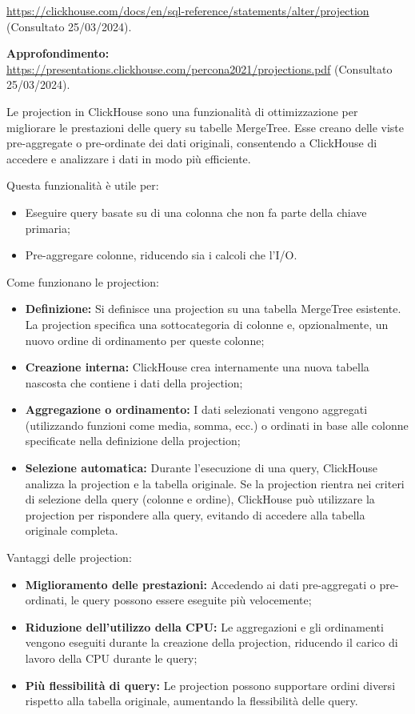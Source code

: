 \url{https://clickhouse.com/docs/en/sql-reference/statements/alter/projection} (Consultato 25/03/2024).

\textbf{Approfondimento:} \url{https://presentations.clickhouse.com/percona2021/projections.pdf} (Consultato 25/03/2024).

Le projection in ClickHouse sono una funzionalità di ottimizzazione per migliorare le prestazioni delle query su tabelle MergeTree. Esse creano delle viste pre-aggregate o pre-ordinate dei dati originali, consentendo a ClickHouse di accedere e analizzare i dati in modo più efficiente.

Questa funzionalità è utile per:

\begin{itemize}
    \item Eseguire query basate su di una colonna che non fa parte della chiave primaria;
    \item Pre-aggregare colonne, riducendo sia i calcoli che l'I/O.
\end{itemize}

Come funzionano le projection:
\begin{itemize}
	\item \textbf{Definizione:} Si definisce una projection su una tabella MergeTree esistente. La projection specifica una sottocategoria di colonne e, opzionalmente, un nuovo ordine di ordinamento per queste colonne;
	\item \textbf{Creazione interna:} ClickHouse crea internamente una nuova tabella nascosta che contiene i dati della projection;
	\item \textbf{Aggregazione o ordinamento:} I dati selezionati vengono aggregati (utilizzando funzioni come media, somma, ecc.) o ordinati in base alle colonne specificate nella definizione della projection;
	\item \textbf{Selezione automatica:} Durante l'esecuzione di una query, ClickHouse analizza la projection e la tabella originale. Se la projection rientra nei criteri di selezione della query (colonne e ordine), ClickHouse può utilizzare la projection per rispondere alla query, evitando di accedere alla tabella originale completa.
\end{itemize}

Vantaggi delle projection:
\begin{itemize}
	\item \textbf{Miglioramento delle prestazioni:} Accedendo ai dati pre-aggregati o pre-ordinati, le query possono essere eseguite più velocemente;
	\item \textbf{Riduzione dell'utilizzo della CPU:} Le aggregazioni e gli ordinamenti vengono eseguiti durante la creazione della projection, riducendo il carico di lavoro della CPU durante le query;
	\item \textbf{Più flessibilità di query:} Le projection possono supportare ordini diversi rispetto alla tabella originale, aumentando la flessibilità delle query.
\end{itemize}

